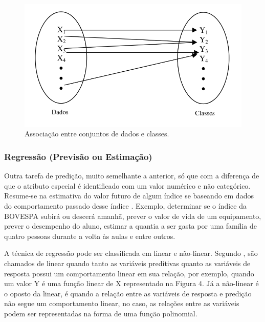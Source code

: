 \begin{figure}[!htp]
	\begin{center}
    \caption{\label{fig:waveform_fig} Associação entre conjuntos de dados e classes.}
	\includegraphics[scale=0.70]{Figuras/Classificacao.png}
	\end{center}
\end{figure}


\subsubsection{Regressão (Previsão ou Estimação)}

\par
Outra tarefa de predição, muito semelhante a anterior, só que com a diferença de que o atributo especial é identificado com um valor numérico e não categórico. Resume-se na estimativa do valor futuro de algum índice se baseando em dados do comportamento passado desse índice \cite{Camilo2009, LeandroSilva2014}. Exemplo, determinar se o índice da BOVESPA subirá ou descerá amanhã, prever o valor de vida de um equipamento, prever o desempenho do aluno, estimar a quantia a ser gasta por uma família de quatro pessoas durante a volta às aulas e entre outros.

\par
A técnica de regressão pode ser classificada em linear e não-linear. Segundo , são chamados de linear quando tanto as variáveis preditivas quanto as variáveis de resposta possui um comportamento linear em sua relação, por exemplo, quando um valor Y é uma função linear de X representado na Figura 4. Já a não-linear é o oposto da linear, é quando a relação entre as variáveis de resposta e predição não segue um comportamento linear, no caso, as relações entre as variáveis podem ser representadas na forma de uma função polinomial. 

